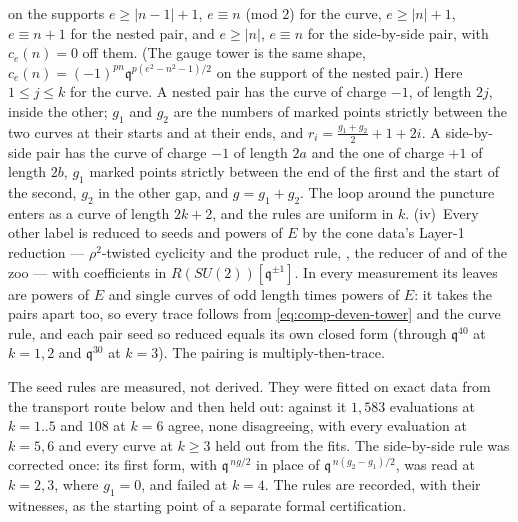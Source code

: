 \documentclass[11pt]{amsart}
\newcommand\fq{\mathfrak{q}}
\theoremstyle{remark}
\begin{document}
on the supports $e\ge|n-1|+1$, $e\equiv n$ (mod $2$) for the curve,
$e\ge|n|+1$, $e\equiv n+1$ for the nested pair, and $e\ge|n|$, $e\equiv n$ for
the side-by-side pair, with $c_e(n)=0$ off them.  (The gauge tower is the same
shape, $c_e(n)=(-1)^{pn}\fq^{p(e^2-n^2-1)/2}$ on the support of the nested
pair.)  Here $1\le j\le k$ for the curve.  A nested pair has the curve of
charge $-1$, of length $2j$, inside the other; $g_1$ and $g_2$ are the numbers
of marked points strictly between the two curves at their starts and at their
ends, and $r_i=\tfrac{g_1+g_2}2+1+2i$.  A side-by-side pair has the curve of
charge $-1$ of length $2a$ and the one of charge $+1$ of length $2b$, $g_1$
marked points strictly between the end of the first and the start of the
second, $g_2$ in the other gap, and $g=g_1+g_2$.  The loop around the puncture
enters as a curve of length $2k+2$, and the rules are uniform in $k$.
(iv)~Every other label is reduced to seeds and powers of $E$ by the cone
data's Layer-1 reduction --- $\rho^2$-twisted cyclicity and the product rule,
, the reducer of
 and of the zoo --- with coefficients in
$R(SU(2))[\fq^{\pm1}]$.  In every measurement its leaves are powers of $E$ and
single curves of odd length times powers of $E$: it takes the pairs apart
too, so every trace follows from \eqref{eq:comp-deven-tower} and the curve
rule, and each pair seed so reduced equals its own closed form (through
$\fq^{40}$ at $k=1,2$ and $\fq^{30}$ at $k=3$).  The pairing is
multiply-then-trace.

The seed rules are measured, not derived.  They were fitted on exact data
from the transport route below and then held out: against it $1{,}583$
evaluations at $k=1..5$ and $108$ at $k=6$ agree, none disagreeing, with every
evaluation at $k=5,6$ and every curve at $k\ge3$ held out from the fits.  The
side-by-side rule was corrected once: its first form, with $\fq^{\,ng/2}$ in
place of $\fq^{\,n(g_2-g_1)/2}$, was read at $k=2,3$, where $g_1=0$, and failed
at $k=4$.  The rules are recorded, with their witnesses, as the starting point of
a separate formal certification.
\end{document}
